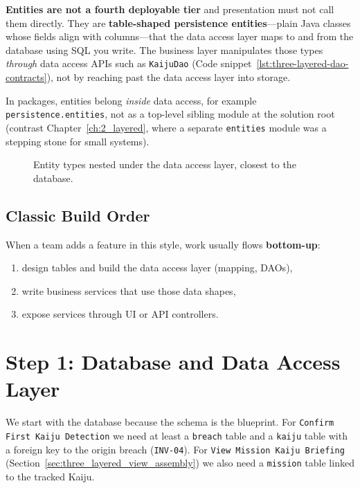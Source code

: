 \textbf{Entities are not a fourth deployable tier} and presentation must not call them directly. They are \textbf{table-shaped persistence entities}---plain Java classes whose fields align with columns---that the data access layer maps to and from the database using SQL you write. The business layer manipulates those types \textit{through} data access APIs such as \texttt{KaijuDao} (Code snippet~\ref{lst:three-layered-dao-contracts}), not by reaching past the data access layer into storage.

In packages, entities belong \textit{inside} data access, for example \texttt{persistence.entities}, not as a top-level sibling module at the solution root (contrast Chapter~\ref{ch:2_layered}, where a separate \texttt{entities} module was a stepping stone for small systems).

\begin{figure}[h]
\centering
\begin{minipage}{0.8\textwidth}
\end{minipage}
\caption{Entity types nested under the data access layer, closest to the database.}
\label{fig:three_layered_dal_entities}
\end{figure}

\subsection{Classic Build Order}
\label{sec:three_layered_build_order}

When a team adds a feature in this style, work usually flows \textbf{bottom-up}:\autocite{microsoft2003layered}
\begin{enumerate}
    \item design tables and build the data access layer (mapping, DAOs),
    \item write business services that use those data shapes,
    \item expose services through UI or API controllers.
\end{enumerate}

\section{Step 1: Database and Data Access Layer}
\label{sec:three_layered_step1}

We start with the database because the schema is the blueprint. For \texttt{Confirm First Kaiju Detection} we need at least a \texttt{breach} table and a \texttt{kaiju} table with a foreign key to the origin breach (\texttt{INV-04}). For \texttt{View Mission Kaiju Briefing} (Section~\ref{sec:three_layered_view_assembly}) we also need a \texttt{mission} table linked to the tracked Kaiju.

